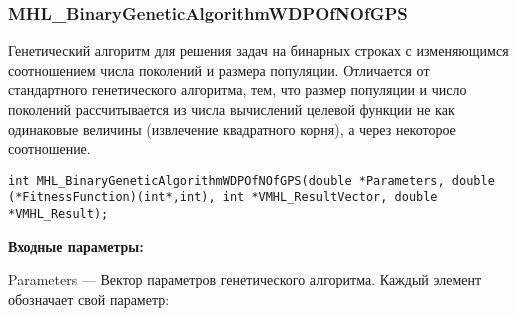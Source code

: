 \documentclass[a4paper,12pt]{article}
\begin{document}
\subsubsection{MHL\_BinaryGeneticAlgorithmWDPOfNOfGPS}\label{MHL_BinaryGeneticAlgorithmWDPOfNOfGPS}

Генетический алгоритм для решения задач на бинарных строках с изменяющимся соотношением числа поколений и размера популяции. Отличается от стандартного генетического алгоритма, тем, что размер популяции и число поколений рассчитывается из числа вычислений целевой функции не как одинаковые величины (извлечение квадратного корня), а через некоторое соотношение.


\begin{lstlisting}[label=code_syntax_MHL_BinaryGeneticAlgorithmWDPOfNOfGPS,caption=Синтаксис]
int MHL_BinaryGeneticAlgorithmWDPOfNOfGPS(double *Parameters, double (*FitnessFunction)(int*,int), int *VMHL_ResultVector, double *VMHL_Result);
\end{lstlisting}

\textbf{Входные параметры:}
 
Parameters --- Вектор параметров генетического алгоритма. Каждый элемент обозначает свой параметр:
 
\end{document}
